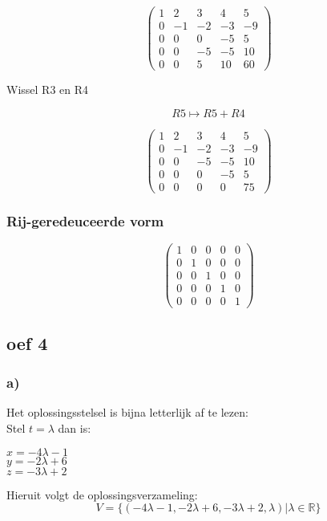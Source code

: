 \documentclass[10pt,a4paper]{article}
\begin{document}
\[
\begin{pmatrix}
1 &  2 &  3 &  4 &  5\\
0 & -1 & -2 & -3 & -9\\
0 &  0 &  0 & -5 &  5\\
0 &  0 & -5 & -5 & 10\\
0 &  0 &  5 & 10 & 60 
\end{pmatrix}
\]
\begin{center}
Wissel R3 en R4
\end{center}
\[ R5 \longmapsto R5 + R4\]

\[
\begin{pmatrix}
1 &  2 &  3 &  4 &  5\\
0 & -1 & -2 & -3 & -9\\
0 &  0 & -5 & -5 & 10\\
0 &  0 &  0 & -5 &  5\\
0 &  0 &  0 &  0 & 75 
\end{pmatrix}
\]

\subsubsection*{Rij-geredeuceerde vorm}
\[
\begin{pmatrix}
1 &  0 &  0 &  0 & 0\\
0 &  1 &  0 &  0 & 0\\
0 &  0 &  1 &  0 & 0\\
0 &  0 &  0 &  1 & 0\\
0 &  0 &  0 &  0 & 1 
\end{pmatrix}
\]

\subsection*{oef 4}
\subsubsection*{a)}
Het oplossingsstelsel is bijna letterlijk af te lezen:\\
Stel $t=\lambda$ dan is:\\
\begin{center}
$x = -4\lambda - 1$\\
$y = -2\lambda + 6$\\
$z = -3\lambda + 2$\\
\end{center}
Hieruit volgt de oplossingsverzameling:
\[
V=\{(-4\lambda - 1,-2\lambda + 6,-3\lambda + 2, \lambda)|\lambda \in \mathbb{R}\}
\]
\end{document}
